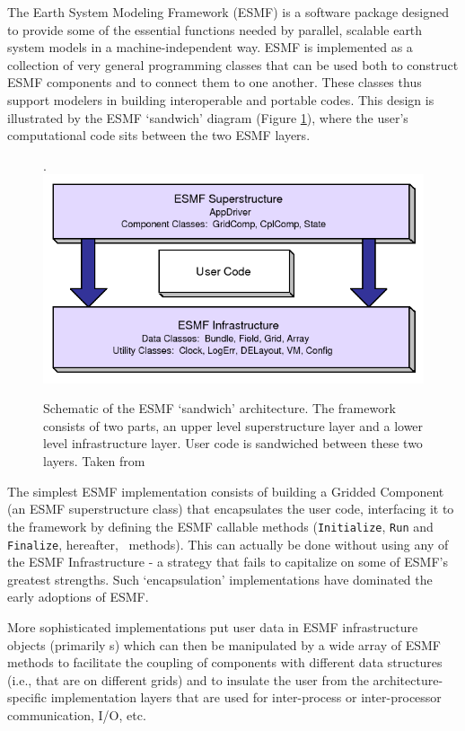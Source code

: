 The Earth System Modeling Framework (ESMF) \cite{deluca} is a
software package designed to provide some of the essential functions
needed by parallel, scalable earth system models in a
machine-independent way. ESMF is implemented as a collection of very
general programming classes that can be used both to construct ESMF
components and to connect them to one another.
These classes thus support modelers in
building interoperable and portable codes. This design is illustrated
by the ESMF `sandwich' diagram (Figure \ref{fig:esmf_sandwich}), where the
user's computational code sits between the two ESMF layers.
%
\begin{figure}[h]
  \label{fig:esmf_sandwich}
  \caption{Schematic of the ESMF `sandwich' architecture. The
    framework consists of two parts, an upper level superstructure
    layer and a lower level infrastructure layer. User code is
    sandwiched between these two layers. Taken from \cite{esmfManual}}.
  \centering
  \includegraphics[scale=0.7]{figs/esmf_sandwich.png}
\end{figure}
%

The simplest ESMF implementation consists of building a Gridded
Component (an ESMF superstructure class) that encapsulates the user
code, interfacing it to the framework by defining the ESMF callable
methods (\texttt{Initialize}, \texttt{Run} and \texttt{Finalize},
hereafter, \IRF\ methods). This
can actually be done without using any of the ESMF Infrastructure - a
strategy that fails to capitalize on some of ESMF's greatest
strengths. Such `encapsulation' implementations have dominated the early
adoptions of ESMF.

More sophisticated implementations put user data in ESMF
infrastructure objects (primarily \fld s) which can then be
manipulated by a wide array of ESMF methods to facilitate the coupling
of components with different data structures (i.e., that are on
different grids) and to insulate the user
from the architecture-specific implementation layers that are used for
inter-process or inter-processor communication, I/O, etc.


